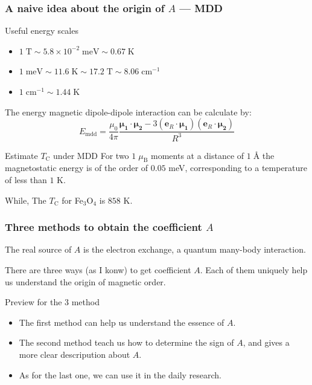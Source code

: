 \documentclass{beamer}
\begin{document}
  \begin{frame}
    \frametitle{A naive idea about the origin of \(A\) --- MDD}
    \begin{block}{Useful energy scales}
      \begin{itemize}
        \item \(1\;\text{T} \sim 5.8\times10^{-2}\;\text{meV} \sim 0.67\;\text{K}\)
        \item \(1\;\text{meV} \sim 11.6\;\text{K} \sim 17.2\;\text{T} \sim 8.06\;\text{cm}^{-1}\)
        \item \(1\;\text{cm}^{-1} \sim 1.44\;\text{K}\)
      \end{itemize}
    \end{block}
    The energy magnetic dipole-dipole interaction can be calculate by:
      \begin{equation}
        E_{\text{mdd}} = \dfrac{\mu_0}{4\pi} \dfrac{\bm{\mu_1}\cdot\bm{\mu_2} - 3(\bm{e}_R\cdot\bm{\mu_1})(\bm{e}_R\cdot\bm{\mu_2})}{R^3}
      \end{equation}

    \begin{block}{Estimate \(T_\text{C}\) under MDD}
      For two \(1\;\mu_{\text{B}}\) moments at a distance of \(1\;\text{\AA}\) the magnetostatic energy is of the order of \(0.05\) meV, corresponding to a temperature of less than \(1\) K. 
    \end{block}
    While, The \(T_\text{C}\) for Fe\(_3\)O\(_4\) is \(858\) K.
  \end{frame}

  \begin{frame}
    \frametitle{Three methods to obtain the coefficient \(A\)}
    The real source of \(A\) is the electron exchange, a quantum many-body interaction. 
    
    There are three ways (as I konw) to get coefficient \(A\). Each of them uniquely help us understand the origin of magnetic order.
    \begin{block}{Preview for the 3 method}
      \begin{itemize}
        \item The first method can help us understand the essence of \(A\).
        \item The second method teach us how to determine the sign of \(A\), and gives a more clear descripution about \(A\).
        \item As for the last one, we can use it in the daily research.
      \end{itemize}
    \end{block}
  \end{frame}
\end{document}
